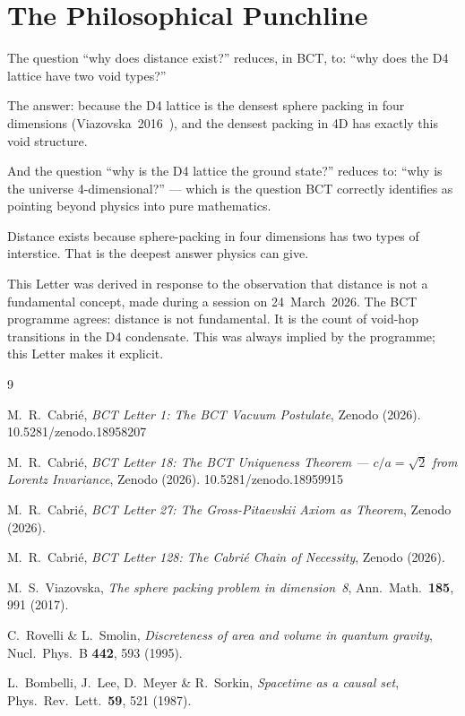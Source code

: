 \documentclass[aps,prl,twocolumn,showpacs,preprintnumbers]{revtex4-2}
\begin{document}
\section{The Philosophical Punchline}

The question ``why does distance exist?'' reduces, in BCT, to:
``why does the D4 lattice have two void types?''

The answer: because the D4 lattice is the densest sphere packing
in four dimensions (Viazovska~2016~\cite{viazovska}), and the
densest packing in 4D has exactly this void structure.

And the question ``why is the D4 lattice the ground state?''
reduces to: ``why is the universe 4-dimensional?'' --- which is
the question BCT correctly identifies as pointing beyond physics
into pure mathematics.

Distance exists because sphere-packing in four dimensions has
two types of interstice. That is the deepest answer physics
can give.

\begin{acknowledgments}
This Letter was derived in response to the observation that
distance is not a fundamental concept, made during a session
on 24~March~2026. The BCT programme agrees: distance is not
fundamental. It is the count of void-hop transitions in the
D4 condensate. This was always implied by the programme;
this Letter makes it explicit.
\end{acknowledgments}

\begin{thebibliography}{9}

M.~R.~Cabri\'e, \textit{BCT Letter 1: The BCT Vacuum Postulate},
Zenodo (2026). 10.5281/zenodo.18958207

M.~R.~Cabri\'e, \textit{BCT Letter 18: The BCT Uniqueness Theorem
--- $c/a=\sqrt{2}$ from Lorentz Invariance},
Zenodo (2026). 10.5281/zenodo.18959915

M.~R.~Cabri\'e, \textit{BCT Letter 27: The Gross-Pitaevskii
Axiom as Theorem}, Zenodo (2026).

M.~R.~Cabri\'e, \textit{BCT Letter 128: The Cabri\'e Chain of
Necessity}, Zenodo (2026).

M.~S.~Viazovska,
\textit{The sphere packing problem in dimension~8},
Ann.\ Math.\ \textbf{185}, 991 (2017).

C.~Rovelli \& L.~Smolin,
\textit{Discreteness of area and volume in quantum gravity},
Nucl.\ Phys.\ B \textbf{442}, 593 (1995).

L.~Bombelli, J.~Lee, D.~Meyer \& R.~Sorkin,
\textit{Spacetime as a causal set},
Phys.\ Rev.\ Lett.\ \textbf{59}, 521 (1987).

\end{thebibliography}
\end{document}
